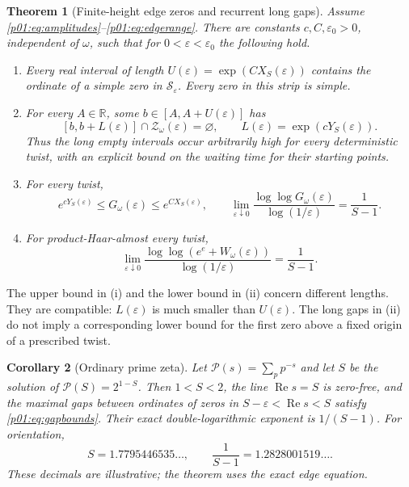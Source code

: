 \documentclass[11pt,letterpaper]{article}
\newtheorem{theorem}{Theorem}[section]
\newtheorem{corollary}[theorem]{Corollary}
\theoremstyle{definition}
\theoremstyle{remark}
\newcommand{\R}{\mathbb R}
\newcommand{\eps}{\varepsilon}
\newcommand{\Ree}{\operatorname{Re}}
\newcommand{\1}{\mathbf 1}
\begin{document}
\begin{theorem}[Finite-height edge zeros and recurrent long gaps]\label{p01:thm:zeros}
Assume \eqref{p01:eq:amplitudes}--\eqref{p01:eq:edgerange}. There are constants
$c,C,\eps_0>0$, independent of $\omega$, such that for
$0<\eps<\eps_0$ the following hold.
\begin{enumerate}[label=\textup{(\roman*)},leftmargin=2.1em]
\item Every real interval of length
$U(\eps)=\exp(CX_S(\eps))$ contains the ordinate of a simple zero in
$\mathcal S_\eps$. Every zero in this strip is simple.
\item For every $A\in\R$, some
$b\in[A,A+U(\eps)]$ has
\[
 [b,b+L(\eps)]\cap\mathcal Z_\omega(\eps)=\varnothing,
 \qquad L(\eps)=\exp(cY_S(\eps)).
\]
Thus the long empty intervals occur arbitrarily high for every
deterministic twist, with an explicit bound on the waiting time for
their starting points.
\item For every twist,
\begin{equation}\label{p01:eq:gapbounds}
 e^{cY_S(\eps)}\le G_\omega(\eps)\le e^{CX_S(\eps)},\qquad
 \lim_{\eps\downarrow0}
 \frac{\log\log G_\omega(\eps)}{\log(1/\eps)}
 =\frac1{S-1}.
\end{equation}
\item For product-Haar-almost every twist,
\begin{equation}\label{p01:eq:zerowaiting}
 \lim_{\eps\downarrow0}
 \frac{\log\log(e^e+W_\omega(\eps))}{\log(1/\eps)}
 =\frac1{S-1}.
\end{equation}
\end{enumerate}
\end{theorem}

The upper bound in (i) and the lower bound in (ii) concern different
lengths. They are compatible: $L(\eps)$ is much smaller than
$U(\eps)$. The long gaps in (ii) do not imply a corresponding lower
bound for the first zero above a fixed origin of a prescribed twist.

\begin{corollary}[Ordinary prime zeta]\label{p01:cor:primezeta}
Let $\mathcal P(s)=\sum_p p^{-s}$ and let $S$ be the solution of
$\mathcal P(S)=2^{1-S}$. Then $1<S<2$, the line $\Ree s=S$ is zero-free,
and the maximal gaps between ordinates of zeros in
$S-\eps<\Ree s<S$ satisfy \eqref{p01:eq:gapbounds}. Their exact
double-logarithmic exponent is $1/(S-1)$.
For orientation,
\[
 S=1.7795446535\ldots,\qquad \frac1{S-1}=1.2828001519\ldots .
\]
These decimals are illustrative; the theorem uses the exact edge equation.
\end{corollary}
\end{document}
